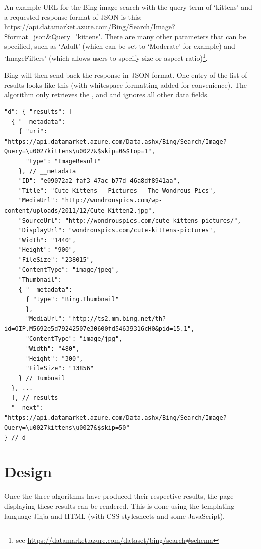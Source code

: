 \spirals

An example \ac{URL} for the Bing image search with the query term of `kittens' and a requested response format of \ac{JSON} is this:
\url{https://api.datamarket.azure.com/Bing/Search/Image?$format=json&Query='kittens'}. There are many other parameters that can be specified, such as `Adult' (which can be set to `Moderate' for example) and `ImageFilters' (which allows users to specify size or aspect ratio)\footnote{see \url{https://datamarket.azure.com/dataset/bing/search\#schema}}.

Bing will then send back the response in \ac{JSON} format. One entry of the list of results looks like this (with whitespace formatting added for convenience). The algorithm only retrieves the ,  and  and ignores all other data fields.

\begin{verbatim}
"d": { "results": [
  { "__metadata":
    { "uri": "https://api.datamarket.azure.com/Data.ashx/Bing/Search/Image?Query=\u0027kittens\u0027&$skip=0&$top=1",
      "type": "ImageResult"
    }, // __metadata
    "ID": "e09072a2-faf3-47ac-b77d-46a8df8941aa",
    "Title": "Cute Kittens - Pictures - The Wondrous Pics",
    "MediaUrl": "http://wondrouspics.com/wp-content/uploads/2011/12/Cute-Kitten2.jpg",
    "SourceUrl": "http://wondrouspics.com/cute-kittens-pictures/",
    "DisplayUrl": "wondrouspics.com/cute-kittens-pictures",
    "Width": "1440",
    "Height": "900",
    "FileSize": "238015",
    "ContentType": "image/jpeg",
    "Thumbnail":
    { "__metadata":
      { "type": "Bing.Thumbnail"
      },
      "MediaUrl": "http://ts2.mm.bing.net/th?id=OIP.M5692e5d79242507e30600fd54639316cH0&pid=15.1",
      "ContentType": "image/jpg",
      "Width": "480",
      "Height": "300",
      "FileSize": "13856"
    } // Tumbnail
  }, ...
  ], // results
  "__next": "https://api.datamarket.azure.com/Data.ashx/Bing/Search/Image?Query=\u0027kittens\u0027&$skip=50"
} // d
\end{verbatim}


\section{Design}

Once the three algorithms have produced their respective results, the page displaying these results can be rendered. This is done using the templating language Jinja and \ac{HTML} (with \ac{CSS} stylesheets and some JavaScript).

